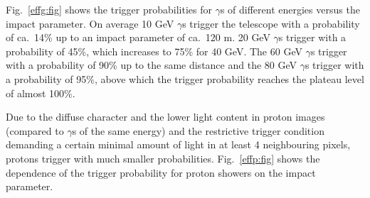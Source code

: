 Fig.~\ref{effg:fig} shows the trigger probabilities for $\gamma$s
of different energies versus the impact parameter.
On average 10 GeV $\gamma$s trigger the telescope
with a probability of ca.~14\% up to an
impact parameter of ca.~120 m. 20
GeV $\gamma$s trigger with a probability of 45\%, which increases to 75\%
for 40 GeV. The 60 GeV $\gamma$s trigger with a probability of 90\% up to
the same distance and the 80 GeV $\gamma$s trigger with a probability of
95\%, above which the trigger probability reaches the plateau level of
almost 100\%.


Due to the diffuse character and the lower light content in proton images
(compared to $\gamma$s of the same energy) and the restrictive trigger
condition demanding a certain minimal amount of light in at least 4
neighbouring pixels, protons trigger with much smaller probabilities.
Fig.~\ref{effp:fig} shows the dependence of the trigger probability
for proton showers on the impact parameter.

